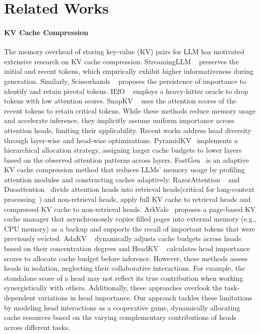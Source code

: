 \section{Related Works}

\paragraph{KV Cache Compression} The memory overhead of storing key-value (KV) pairs for LLM has motivated extensive research on KV cache compression. StreamingLLM ~\cite{StreamingLLM} preserves the initial and recent tokens, which empirically exhibit higher informativeness during generation. Similarly, Scissorhands ~\cite{scissorhands} proposes the persistence of importance to identify and retain pivotal tokens. H2O ~\cite{H2O} employs a heavy-hitter oracle to drop tokens with low attention scores.  SnapKV ~\cite{SnapKV} uses the attention scores of the recent tokens to retain critical tokens. While these methods reduce memory usage and accelerate inference, they implicitly assume uniform importance across attention heads, limiting their applicability.  Recent works address head diversity through layer-wise and head-wise optimizations. PyramidKV~\cite{PyramidKV} implements a hierarchical allocation strategy, assigning larger cache budgets to lower layers based on the observed attention patterns across layers. FastGen~\cite{FastGen} is an adaptive KV cache compression method that reduces LLMs' memory usage by profiling attention modules and constructing caches adaptively. RazorAttention ~\cite{Razorattention} and Duoattention~\cite{Duoattention} divide attention heads into retrieval heads(critical for long-context processing~\cite{retrievalheads}) and non-retrieval heads, apply full KV cache to retrieval heads and compressed KV cache to non-retrieval heads. ArkVale~\cite{chen2025arkvale} proposes a page-based KV cache manager that asynchronously copies filled pages into external memory (e.g., CPU memory) as a backup and supports the recall of important tokens that were previously evicted. AdaKV ~\cite{AdaKV} dynamically adjusts cache budgets across heads based on their concentration degrees and HeadKV ~\cite{HeadKV} calculates head importance scores to allocate cache budget before inference.
However, these methods assess heads in isolation, neglecting their collaborative interactions. For example, the standalone score of a head may not reflect its true contribution when working synergistically with others. Additionally, these approaches overlook the task-dependent variations in head importance. 
Our approach tackles these limitations by modeling head interactions as a cooperative game, dynamically allocating cache resources based on the varying complementary contributions of heads across different tasks.

